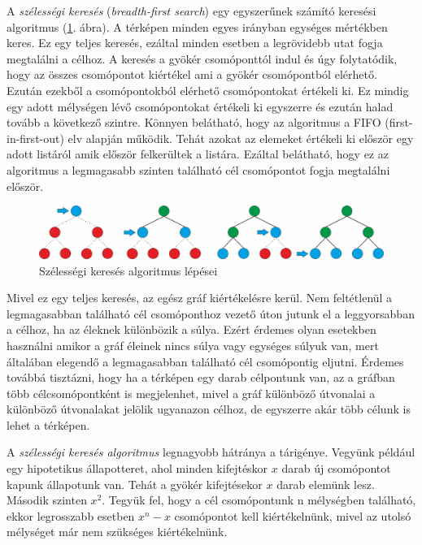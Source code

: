 A \textit{szélességi keresés} (\textit{breadth-first search}) egy egyszerűnek számító keresési algoritmus (\ref{fig:breadth-first_search}. ábra). A térképen minden egyes irányban egységes mértékben keres. Ez egy teljes keresés, ezáltal minden esetben a legrövidebb utat fogja megtalálni a célhoz. A keresés a gyökér csomóponttól indul és úgy folytatódik, hogy az összes csomópontot kiértékel ami a gyökér csomópontból elérhető. Ezután ezekből a csomópontokból elérhető csomópontokat értékeli ki. Ez mindig egy adott mélységen lévő csomópontokat értékeli ki egyszerre és ezután halad tovább a következő szintre. Könnyen belátható, hogy az algoritmus a FIFO (first-in-first-out) elv alapján működik. Tehát azokat az elemeket értékeli ki először egy adott listáról amik először felkerültek a listára. Ezáltal belátható, hogy ez az algoritmus a legmagasabb szinten található cél csomópontot fogja megtalálni először. 

\begin{figure}[h!]
\centering
\includegraphics[scale=0.4]{kepek/breadth-first_search.jpg}
\caption{Szélességi keresés algoritmus lépései}
\label{fig:breadth-first_search}
\end{figure}

Mivel ez egy teljes keresés, az egész gráf kiértékelésre kerül. Nem feltétlenül a legmagasabban található cél csomóponthoz vezető úton jutunk el a leggyorsabban a célhoz, ha az éleknek különbözik a súlya. Ezért érdemes olyan esetekben használni amikor a gráf éleinek nincs súlya vagy egységes súlyuk van, mert általában elegendő a legmagasabban található cél csomópontig eljutni. Érdemes továbbá tisztázni, hogy ha a térképen egy darab célpontunk van, az a gráfban több célcsomópontként is megjelenhet, mivel a gráf különböző útvonalai a különböző útvonalakat jelölik ugyanazon célhoz, de egyszerre akár több célunk is lehet a térképen.

A \textit{szélességi keresés algoritmus} legnagyobb hátránya a tárigénye. Vegyünk például egy hipotetikus állapotteret, ahol minden kifejtéskor $x$ darab új csomópontot kapunk állapotunk van. Tehát a gyökér kifejtésekor $x$ darab elemünk lesz. Második szinten $x^2$. Tegyük fel, hogy a cél csomópontunk n mélységben található, ekkor legrosszabb esetben $x^n - x$ csomópontot kell kiértékelnünk, mivel az utolsó mélységet már nem szükséges kiértékelnünk. 

